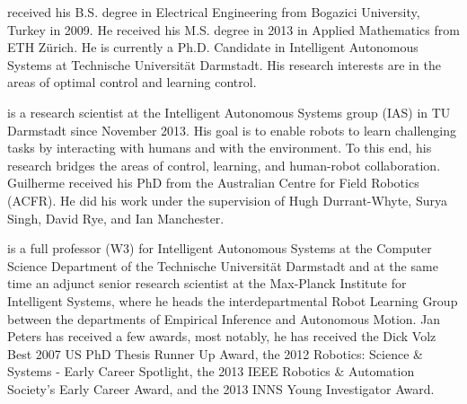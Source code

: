 \documentclass[twocolumn,authoryear,5p]{elsarticle}
\begin{document}

%
%


 received his B.S. degree in Electrical Engineering from Bogazici University, Turkey in 2009. He received his M.S. degree in 2013 in Applied Mathematics from ETH Z\"urich. He is currently a Ph.D. Candidate in Intelligent Autonomous Systems at Technische Universit\"at Darmstadt. His research interests are in the areas of optimal control and learning control.

 is a research scientist at the Intelligent Autonomous Systems group (IAS) in TU Darmstadt since November 2013. His goal is to enable robots to learn challenging tasks by interacting with humans and with the environment. To this end, his research bridges the areas of control, learning, and human-robot collaboration. Guilherme received his PhD from the Australian Centre for Field Robotics (ACFR). He did his work under the supervision of Hugh Durrant-Whyte, Surya Singh, David Rye, and Ian Manchester. 

 is a full professor (W3) for Intelligent Autonomous Systems at the Computer Science Department of the Technische Universit\"at Darmstadt and at the same time an adjunct senior research scientist at the Max-Planck Institute for Intelligent Systems, where he heads the interdepartmental Robot Learning Group between the departments of Empirical Inference and Autonomous Motion. Jan Peters has received a few awards, most notably, he has received the Dick Volz Best 2007 US PhD Thesis Runner Up Award, the 2012 Robotics: Science \& Systems - Early Career Spotlight, the 2013 IEEE Robotics \& Automation Society's Early Career Award, and the 2013 INNS Young Investigator Award. 
\end{document}
